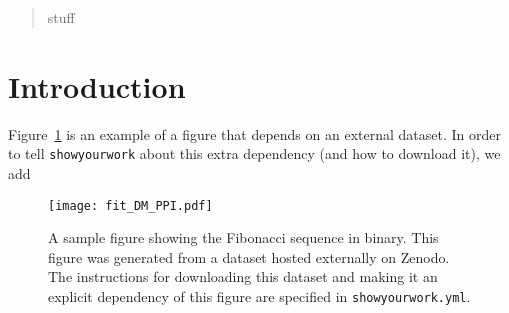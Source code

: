 \documentclass[twocolumn,twocolappendix,trackchanges]{aastex63}
\begin{document}
\graphicspath{{./figures/}}

\begin{abstract}
  stuff
\end{abstract}

\section{Introduction}

Figure~\ref{fig:fit_DM_PPI} is an example of a figure that depends on an external dataset.
In order to tell \texttt{showyourwork} about this extra dependency (and how to download it), we add %

\begin{figure}[ht!]
    \begin{centering}
      \texttt{[image: fit\_DM\_PPI.pdf]}
        \caption{A sample figure showing the Fibonacci sequence in binary.
            This figure was generated from a dataset hosted externally on Zenodo.
            The instructions for downloading this dataset and making it an explicit dependency of this figure are specified in \texttt{showyourwork.yml}.}
        \label{fig:fit_DM_PPI}
    \end{centering}
\end{figure}
\end{document}

